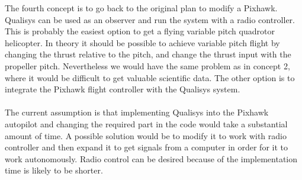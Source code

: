 \noindent The fourth concept is to go back to the original plan to modify a Pixhawk. Qualisys can be used as an observer and run the system with a radio controller. This is probably the easiest option to get a flying variable pitch quadrotor helicopter. In theory it should be possible to achieve variable pitch flight by changing the thrust relative to the pitch, and change the thrust input with the propeller pitch. Nevertheless we would have the same problem as in concept 2, where it would be difficult to get valuable scientific data. The other option is to integrate the Pixhawk flight controller with the Qualisys system. 
\\\\
The current assumption is that implementing Qualisys into the Pixhawk autopilot and changing the required part in the code would take a substantial amount of time. A possible solution would be to modify it to work with radio controller and then expand it to get signals from a computer in order for it to work autonomously. Radio control can be desired because of the implementation time is likely to be shorter.

